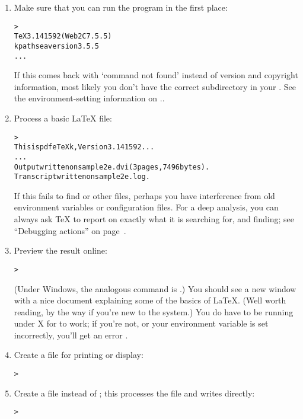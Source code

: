 \documentclass{article}
\begin{document}
\begin{enumerate}

\item Make sure that you can run the  program in the first
place:

\begin{alltt}
> 
TeX 3.141592 (Web2C 7.5.5)
kpathsea version 3.5.5
...
\end{alltt}
If this comes back with `command not found' instead of version and
copyright information, most likely you don't have the correct
 subdirectory in your .  See
the environment-setting information on \p.\pageref{text:path}.

\item Process a basic \LaTeX{} file:
\begin{alltt}
> 
This is pdfeTeXk, Version 3.141592...
...
Output written on sample2e.dvi (3 pages, 7496 bytes).
Transcript written on sample2e.log.
\end{alltt}
If this fails to find  or other files, perhaps
you have interference from old environment variables or configuration
files.  For a deep analysis, you can always ask \TeX{} to report on
exactly what it is searching for, and finding; see ``Debugging actions''
on page~\pageref{Debugging}.

\item Preview the result online:
\begin{alltt}
> 
\end{alltt}
(Under Windows, the analogous command is .)  You should
see a new window with a nice document explaining some of the basics of
\LaTeX{}.  (Well worth reading, by the way if you're new to the system.)
You do have to be running under X for  to work; if you're
not, or your  environment variable is set incorrectly,
you'll get an error .

\item Create a \PS{} file for printing or display:
\begin{alltt}
> 
\end{alltt}

\item Create a  file instead of \dvi{}; this processes the
 file and writes  directly:
\begin{alltt}
> 
\end{alltt}


\end{enumerate}
\end{document}
